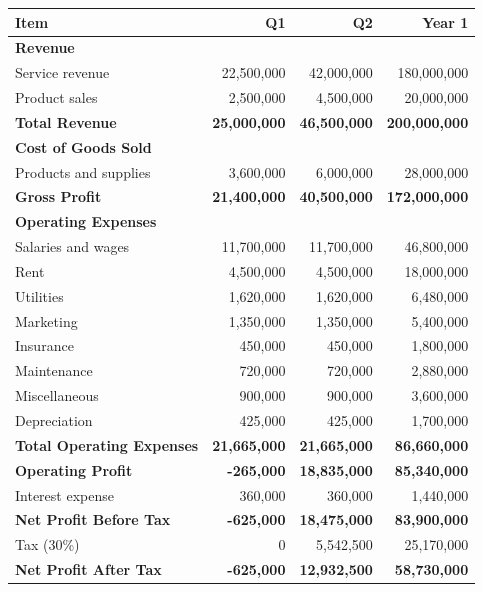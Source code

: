 \documentclass[a4paper,12pt]{article}
\begin{document}
\begin{tabular}{|l|r|r|r|}
\hline
\textbf{Item} & \textbf{Q1} & \textbf{Q2} & \textbf{Year 1} \\
\hline
\multicolumn{4}{|l|}{\textbf{Revenue}} \\
Service revenue & 22,500,000 & 42,000,000 & 180,000,000 \\
Product sales & 2,500,000 & 4,500,000 & 20,000,000 \\
\hline
\textbf{Total Revenue} & \textbf{25,000,000} & \textbf{46,500,000} & \textbf{200,000,000} \\
\hline
\multicolumn{4}{|l|}{\textbf{Cost of Goods Sold}} \\
Products and supplies & 3,600,000 & 6,000,000 & 28,000,000 \\
\hline
\textbf{Gross Profit} & \textbf{21,400,000} & \textbf{40,500,000} & \textbf{172,000,000} \\
\hline
\multicolumn{4}{|l|}{\textbf{Operating Expenses}} \\
Salaries and wages & 11,700,000 & 11,700,000 & 46,800,000 \\
Rent & 4,500,000 & 4,500,000 & 18,000,000 \\
Utilities & 1,620,000 & 1,620,000 & 6,480,000 \\
Marketing & 1,350,000 & 1,350,000 & 5,400,000 \\
Insurance & 450,000 & 450,000 & 1,800,000 \\
Maintenance & 720,000 & 720,000 & 2,880,000 \\
Miscellaneous & 900,000 & 900,000 & 3,600,000 \\
Depreciation & 425,000 & 425,000 & 1,700,000 \\
\hline
\textbf{Total Operating Expenses} & \textbf{21,665,000} & \textbf{21,665,000} & \textbf{86,660,000} \\
\hline
\textbf{Operating Profit} & \textbf{-265,000} & \textbf{18,835,000} & \textbf{85,340,000} \\
\hline
Interest expense & 360,000 & 360,000 & 1,440,000 \\
\hline
\textbf{Net Profit Before Tax} & \textbf{-625,000} & \textbf{18,475,000} & \textbf{83,900,000} \\
\hline
Tax (30\%) & 0 & 5,542,500 & 25,170,000 \\
\hline
\textbf{Net Profit After Tax} & \textbf{-625,000} & \textbf{12,932,500} & \textbf{58,730,000} \\
\hline
\end{tabular}
\end{document}
